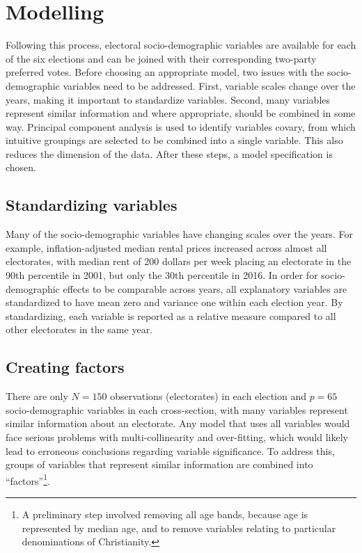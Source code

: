 \documentclass[11pt,a4paper,]{article}
\begin{document}
\section{Modelling}\label{modelling}

Following this process, electoral socio-demographic variables are
available for each of the six elections and can be joined with their
corresponding two-party preferred votes. Before choosing an appropriate
model, two issues with the socio-demographic variables need to be
addressed. First, variable scales change over the years, making it
important to standardize variables. Second, many variables represent
similar information and where appropriate, should be combined in some
way. Principal component analysis is used to identify variables covary,
from which intuitive groupings are selected to be combined into a single
variable. This also reduces the dimension of the data. After these
steps, a model specification is chosen.

\subsection{Standardizing variables}\label{standardizing-variables}

Many of the socio-demographic variables have changing scales over the
years. For example, inflation-adjusted median rental prices increased
across almost all electorates, with median rent of 200 dollars per week
placing an electorate in the 90th percentile in 2001, but only the 30th
percentile in 2016. In order for socio-demographic effects to be
comparable across years, all explanatory variables are standardized to
have mean zero and variance one within each election year. By
standardizing, each variable is reported as a relative measure compared
to all other electorates in the same year.

\subsection{Creating factors}\label{creating-factors}

There are only \(N = 150\) observations (electorates) in each election
and \(p = 65\) socio-demographic variables in each cross-section, with
many variables represent similar information about an electorate. Any
model that uses all variables would face serious problems with
multi-collinearity and over-fitting, which would likely lead to
erroneous conclusions regarding variable significance. To address this,
groups of variables that represent similar information are combined into
``factors''\footnote{A preliminary step involved removing all age bands,
  because age is represented by median age, and to remove variables
  relating to particular denominations of Christianity.}.
\end{document}
